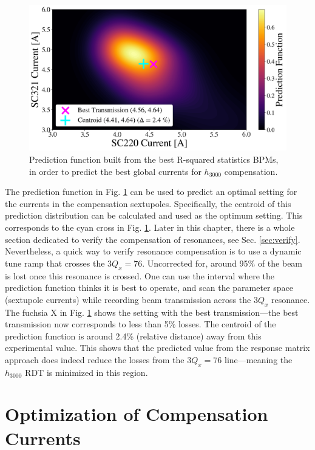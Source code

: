 \begin{figure}[H]
    \centering
    \includegraphics[width=\columnwidth]{chapter4/comp_interval.png}
    \caption{Prediction function built from the best R-squared statistics BPMs, in order to predict the best global currents for $h_{3000}$ compensation.}
    \label{fig:icomp_int}
\end{figure}

The prediction function in Fig. \ref{fig:icomp_int} can be used to predict an optimal setting for the currents in the compensation sextupoles. Specifically, the centroid of this prediction distribution can be calculated and used as the optimum setting. This corresponds to the cyan cross in Fig. \ref{fig:icomp_int}. Later in this chapter, there is a whole section dedicated to verify the compensation of resonances, see Sec. \ref{sec:verify}. Nevertheless, a quick way to verify resonance compensation is to use a dynamic tune ramp that crosses the $3Q_x=76$. Uncorrected for, around 95\% of the beam is lost once this resonance is crossed. One can use the interval where the prediction function thinks it is best to operate, and scan the parameter space (sextupole currents) while recording beam transmission across the $3Q_x$ resonance. The fuchsia X in Fig. \ref{fig:icomp_int} shows the setting with the best transmission---the best transmission now corresponds to less than 5\% losses. The centroid of the prediction function is around 2.4\% (relative distance) away from this experimental value. This shows that the predicted value from the response matrix approach does indeed reduce the losses from the $3Q_x=76$ line---meaning the $h_{3000}$ RDT is minimized in this region.

\section{\label{sec:optimize}Optimization of Compensation Currents}

